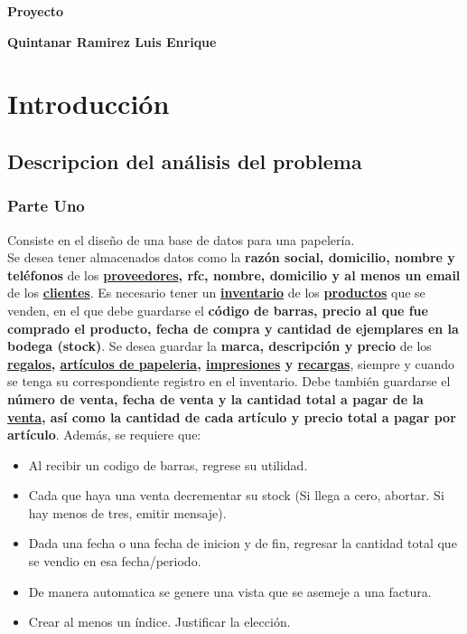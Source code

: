 \documentclass[letter,12pt]{article}
\begin{document}
\vspace*{0.3cm} 						%

\begin{center} 							%
	{\Large \bf Proyecto} 	\\		%
	\vspace{2mm}
	
	{\bf Quintanar Ramirez Luis Enrique} %
\end{center}  							%


\section{Introducci\'on}
\subsection{Descripcion del an\'alisis del problema}
\subsubsection{Parte Uno}
Consiste en el diseño de una base de datos para una papeler\'ia.\\
Se desea tener almacenados datos como la {\bf raz\'on social, domicilio, nombre y
tel\'efonos} de los {\bf \ul{proveedores}, rfc, nombre, domicilio y al menos un email} de los
{\bf \ul{clientes}}. Es necesario tener un {\bf \ul{inventario}} de los {\bf \ul{productos}} 
que se venden, en el
que debe guardarse el {\bf código de barras, precio al que fue comprado el producto,
fecha de compra y cantidad de ejemplares en la bodega (stock)}. Se desea guardar
la {\bf marca, descripci\'on y precio} de los {\bf \ul{regalos}, \ul{art\'iculos de papeleria}, 
\ul{impresiones} y
\ul{recargas}}, siempre y cuando se tenga su correspondiente registro en el inventario.
Debe tambi\'en guardarse el {\bf número de venta, fecha de venta y la cantidad total
a pagar de la \ul{venta}, as\'i como la cantidad de cada art\'iculo y precio total a pagar
por art\'iculo}. Adem\'as, se requiere que:
\begin{itemize}
\item Al recibir un codigo de barras, regrese su utilidad.
\item Cada que haya una venta decrementar su stock (Si llega a cero, abortar. Si hay menos de tres, emitir mensaje).
\item Dada una fecha o una fecha de inicion y de fin, regresar la cantidad total que se vendio en esa fecha/periodo.
\item De manera automatica se genere una vista que se asemeje a una factura.
\item Crear al menos un índice. Justificar la elecci\'on.
\end{itemize}
\end{document}
